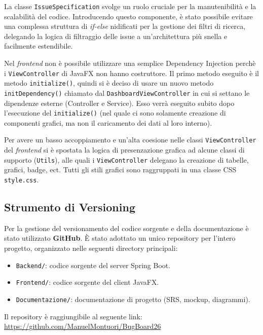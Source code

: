 \documentclass[a4paper,12pt]{article}
\begin{document}
La classe \texttt{IssueSpecification} svolge un ruolo cruciale per la manutenibilità e la scalabilità del codice. Introducendo questo componente, è stato possibile evitare una complessa struttura di \textit{if-else} nidificati per la gestione dei filtri di ricerca, delegando la logica di filtraggio delle issue a un'architettura più snella e facilmente estendibile.

Nel \textit{frontend} non è possibile utilizzare una semplice Dependency Injection perchè i \texttt{ViewController} di JavaFX non hanno costruttore. Il primo metodo eseguito è il metodo \texttt{initialize()}, quindi si è deciso di usare un nuovo metodo \texttt{initDependency()} chiamato dal \texttt{DashboardViewController} in cui si settano le dipendenze esterne (Controller e Service). Esso verrà eseguito subito dopo l'esecuzione del \texttt{initialize()} (nel quale ci sono solamente creazione di componenti grafici, ma non il caricamento dei dati al loro interno).  

Per avere un basso accoppiamento e un'alta coesione nelle classi \texttt{ViewController} del \textit{frontend} si è spostata la logica di presenzazione grafica ad alcune classi di supporto (\texttt{Utils}), alle quali i \texttt{ViewController} delegano la creazione di tabelle, grafici, badge, ect. Tutti gli stili grafici sono raggruppati in una classe CSS \texttt{style.css}. 
 

\subsection{Strumento di Versioning} Per la gestione del versionamento del codice sorgente e della documentazione è stato utilizzato \textbf{GitHub}. È stato adottato un unico repository per l'intero progetto, organizzato nelle seguenti directory principali:
\begin{itemize}
    \item \texttt{Backend/}: codice sorgente del server Spring Boot. 
    \item \texttt{Frontend/}: codice sorgente del client JavaFX.
    \item \texttt{Documentazione/}: documentazione di progetto (SRS, mockup, diagrammi).
\end{itemize}

Il repository è raggiungibile al seguente link: \url{https://github.com/ManuelMontuori/BugBoard26}
\end{document}
